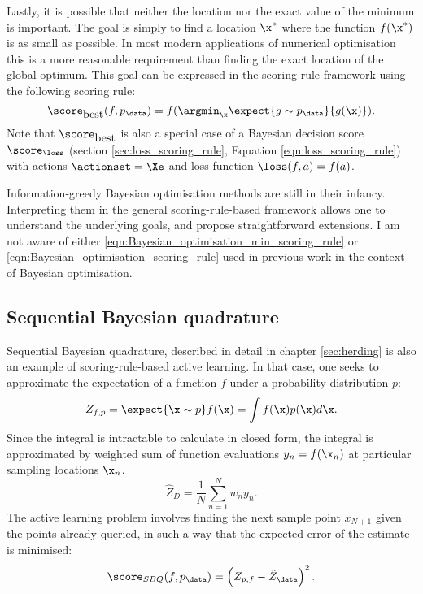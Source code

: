 Lastly, it is possible that neither the location nor the exact value of the minimum is important. The goal is simply to find a location $\x^{*}$ where the function $f(\x^{*})$ is as small as possible. In most modern applications of numerical optimisation this is a more reasonable requirement than finding the exact location of the global optimum. This goal can be expressed in the scoring rule framework using the following scoring rule:
%
\begin{equation}
	\score_{\mbox{best}}(f,p_\data) = f(\argmin_{\x}\expect{g\sim p_\data}{g(\x)}). \label{eqn:Bayesian_optimisation_scoring_rule}
\end{equation}
%
Note that $\score_{\mbox{best}}$ is also a special case of a Bayesian decision score $\score_{\loss}$ (section \ref{sec:loss_scoring_rule}, Equation \eqref{eqn:loss_scoring_rule}) with actions $\actionset=\Xe$ and loss function $\loss(f,a)=f(a)$.

Information-greedy Bayesian optimisation methods are still in their infancy. Interpreting them in the general scoring-rule-based framework allows one to understand the underlying goals, and propose straightforward extensions. I am not aware of either \eqref{eqn:Bayesian_optimisation_min_scoring_rule} or \eqref{eqn:Bayesian_optimisation_scoring_rule} used in previous work in the context of Bayesian optimisation.

\subsection{Sequential Bayesian quadrature}

Sequential Bayesian quadrature, described in detail in chapter \ref{sec:herding} is also an example of scoring-rule-based active learning. In that case, one seeks to approximate the expectation of a function $f$ under a probability distribution $p$:
%
\begin{equation}
	Z_{f,p} = \expect{\x\sim p}f(\x) = \int f(\x) p(\x) d\x.
\end{equation}
%
Since the integral is intractable to calculate in closed form, the integral is approximated by weighted sum of function evaluations $y_n = f(\x_n)$ at particular sampling locations $\x_n$.
%
\begin{equation}
	\hat{Z}_{D} = \frac{1}{N}\sum_{n=1}^{N} w_n y_n.
\end{equation}
%
The active learning problem involves finding the next sample point $x_{N+1}$ given the points already queried, in such a way that the expected error of the estimate is minimised:
%
\begin{equation}
	\score_{SBQ}(f,p_\data) = \left(Z_{p,f} - \hat{Z}_\data \right)^2.
\end{equation}


